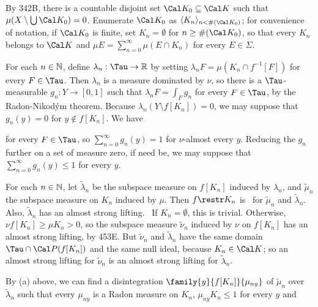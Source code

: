 {\medskip 
      
 By 342B, there is a countable disjoint set 
$\Cal K_0\subseteq\Cal K$ 
such that $\mu(X\setminus\bigcup\Cal K_0)=0$.   Enumerate $\Cal K_0$ as 
$\langle K_n\rangle_{n<\#(\Cal K_0)}$;  for convenience of notation, if 
$\Cal K_0$ is finite, set $K_n=\emptyset$ for $n\ge\#(\Cal K_0)$, so 
that every $K_n$ belongs to $\Cal K$ and $\mu 
E=\sum_{n=0}^{\infty}\mu(E\cap K_n)$ for every $E\in\Sigma$. 
      
\medskip 
      
 For each $n\in\Bbb N$, define $\lambda_n:\Tau\to\Bbb R$ 
by setting $\lambda_nF=\mu(K_n\cap f^{-1}[F])$ for every $F\in\Tau$. 
Then $\lambda_n$ is a measure dominated by $\nu$, so 
there is a $\Tau$-measurable $g_n:Y\to[0,1]$ such that 
$\lambda_nF=\int_Fg_n$ for every 
$F\in\Tau$, by the Radon-Nikod\'ym theorem.   Because 
$\lambda_n(Y\setminus f[K_n])=0$, we may suppose that $g_n(y)=0$ for 
$y\notin f[K_n]$.   We have 
      
      
\noindent for every $F\in\Tau$, so $\sum_{n=0}^{\infty}g_n(y)=1$ for 
$\nu$-almost every $y$.   Reducing the $g_n$ further on a set of measure 
zero, if need be, we may suppose that $\sum_{n=0}^{\infty}g_n(y)\le 1$ 
for 
every $y$. 
      
\medskip 
      
 For each $n\in\Bbb N$, let $\tilde\lambda_n$ be the 
subspace measure on $f[K_n]$ induced by $\lambda_n$, and $\tilde\mu_n$ 
the subspace measure on $K_n$ induced by $\mu$.   Then $f\restr K_n$ is 
\imp\ for $\tilde\mu_n$ and $\tilde\lambda_n$.   Also, $\tilde\lambda_n$ 
has an almost strong lifting.   \Prf\ If $K_n=\emptyset$, this is 
trivial.   Otherwise, $\nu f[K_n]\ge\mu K_n>0$, so the subspace measure 
$\tilde\nu_n$ induced by $\nu$ on $f[K_n]$ has an almost strong lifting, 
by 453E.   But $\tilde\nu_n$ and $\tilde\lambda_n$ have the same domain 
$\Tau\cap\Cal P(f[K_n])$ and the same null ideal, because 
$K_n\in\Cal K$;  so an almost strong lifting for $\tilde\nu_n$ is an 
almost strong lifting for $\tilde\lambda_n$.\ \Qed 
      
By (a) above, we can find a disintegration 
$\family{y}{f[K_n]}{\mu_{ny}}$ of $\tilde\mu_n$ over $\tilde\lambda_n$ 
such that every $\mu_{ny}$ is a Radon measure on $K_n$, 
$\mu_{ny}K_n\le 1$ for every $y$ and 
      
}
